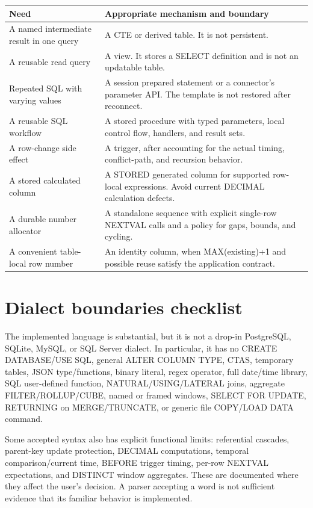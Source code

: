 \begin{longtable}{p{.25\linewidth}p{.68\linewidth}}
\toprule
Need & Appropriate mechanism and boundary \\
\midrule
\endhead
A named intermediate result in one query & A CTE or derived table. It is not persistent. \\
A reusable read query & A view. It stores a SELECT definition and is not an updatable table. \\
Repeated SQL with varying values & A session prepared statement or a connector's parameter API. The template is not restored after reconnect. \\
A reusable SQL workflow & A stored procedure with typed parameters, local control flow, handlers, and result sets. \\
A row-change side effect & A trigger, after accounting for the actual timing, conflict-path, and recursion behavior. \\
A stored calculated column & A STORED generated column for supported row-local expressions. Avoid current DECIMAL calculation defects. \\
A durable number allocator & A standalone sequence with explicit single-row NEXTVAL calls and a policy for gaps, bounds, and cycling. \\
A convenient table-local row number & An identity column, when MAX(existing)+1 and possible reuse satisfy the application contract. \\
\bottomrule
\end{longtable}

\section{Dialect boundaries checklist}

The implemented language is substantial, but it is not a drop-in PostgreSQL, SQLite, MySQL, or SQL Server dialect. In particular, it has no CREATE DATABASE/USE SQL, general ALTER COLUMN TYPE, CTAS, temporary tables, JSON type/functions, binary literal, regex operator, full date/time library, SQL user-defined function, NATURAL/USING/LATERAL joins, aggregate FILTER/ROLLUP/CUBE, named or framed windows, SELECT FOR UPDATE, RETURNING on MERGE/TRUNCATE, or generic file COPY/LOAD DATA command.

Some accepted syntax also has explicit functional limits: referential cascades, parent-key update protection, DECIMAL computations, temporal comparison/current time, BEFORE trigger timing, per-row NEXTVAL expectations, and DISTINCT window aggregates. These are documented where they affect the user's decision. A parser accepting a word is not sufficient evidence that its familiar behavior is implemented.

